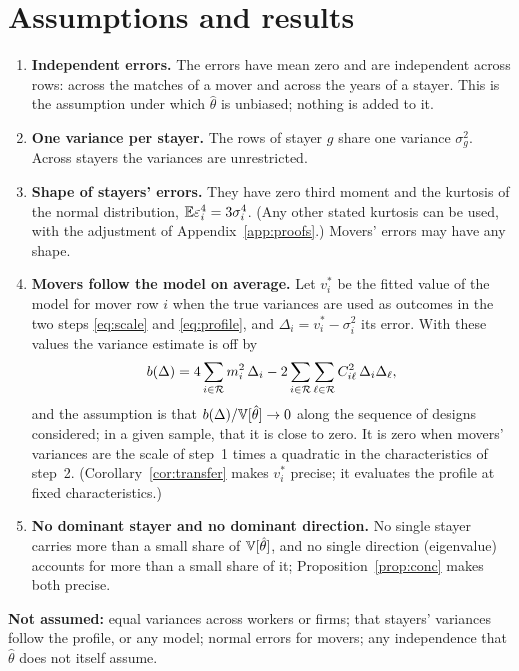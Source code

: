 \section{Assumptions and results}\label{sec:results}

\begin{enumerate}[label=\textbf{A\arabic*.},leftmargin=3em]
\item \textbf{Independent errors.} The errors have mean zero and are independent across rows: across the
matches of a mover and across the years of a stayer. This is the assumption under which $\hat\theta$ is
unbiased; nothing is added to it.
\item \textbf{One variance per stayer.} The rows of stayer $g$ share one variance $\sigma_g^2$. Across stayers
the variances are unrestricted.
\item \textbf{Shape of stayers' errors.} They have zero third moment and the kurtosis of the normal
distribution, $\mathbb{E}\varepsilon_i^4=3\sigma_i^4$. (Any other stated kurtosis can be used, with the adjustment of
Appendix~\ref{app:proofs}.) Movers' errors may have any shape.
\item \textbf{Movers follow the model on average.} Let $v_i^*$ be the fitted value of the model for mover row
$i$ when the true variances are used as outcomes in the two steps \eqref{eq:scale} and \eqref{eq:profile}, and
$\Delta_i=v_i^*-\sigma_i^2$ its error. With these values the variance estimate is off by
\begin{equation}\label{eq:b}
b(\Delta)=4\sum_{i\in\mathcal{R}}m_i^2\,\Delta_i-2\sum_{i\in\mathcal{R}}\sum_{\ell\in\mathcal{R}}C_{i\ell}^2\,\Delta_i\Delta_\ell ,
\end{equation}
and the assumption is that $b(\Delta)/\mathbb{V}[\hat\theta]\to0$ along the sequence of designs considered; in a given
sample, that it is close to zero. It is zero when movers' variances are the scale of step~1 times a quadratic in
the characteristics of step~2. (Corollary~\ref{cor:transfer} makes $v_i^*$ precise; it
evaluates the profile at fixed characteristics.)
\item \textbf{No dominant stayer and no dominant direction.} No single stayer carries more than a small share of
$\mathbb{V}[\hat\theta]$, and no single direction (eigenvalue) accounts for more than a small share of it;
Proposition~\ref{prop:conc} makes both precise.
\end{enumerate}

\smallskip\noindent\textbf{Not assumed:} equal variances across workers or firms; that stayers' variances
follow the profile, or any model; normal errors for movers; any independence that $\hat\theta$ does not itself
assume.

